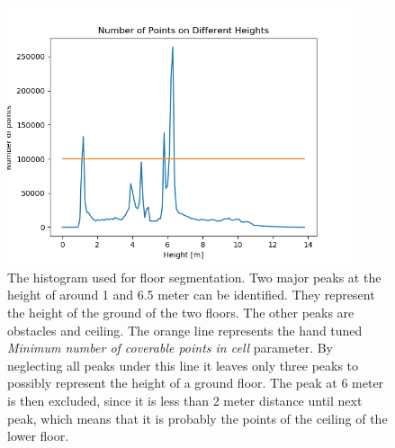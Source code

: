 \begin{figure}
    \centering
    \includegraphics[width=0.9\textwidth]{figures/floorsegmentation.png}
    \caption{The histogram used for floor segmentation. Two major peaks at the height of around 1 and 6.5 meter can be identified. They represent the height of the ground of the two floors. The other peaks are obstacles and ceiling. The orange line represents the hand tuned \emph{Minimum number of coverable points in cell} parameter. By neglecting all peaks under this line it leaves only three peaks to possibly represent the height of a ground floor. The peak at 6 meter is then excluded, since it is less than 2 meter distance until next peak, which means that it is probably the points of the ceiling of the lower floor.}
    \label{fig:floorsegmentation}
\end{figure}



